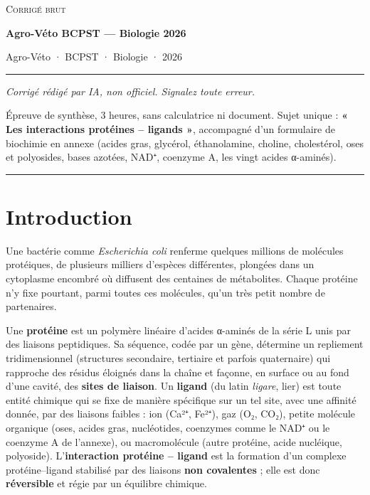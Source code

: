 \documentclass[11pt,a4paper]{article}
\begin{document}
\thispagestyle{plain}
\begin{center}
  {\small\scshape Corrigé brut}\par\smallskip
  {\LARGE\bfseries Agro-Véto BCPST — Biologie 2026\par}\medskip
  {\large Agro-Véto · BCPST · Biologie · 2026\par}
\end{center}
\vspace{2pt}\hrule\vspace{8pt}

\emph{Corrigé rédigé par IA, non officiel. Signalez toute erreur.}

Épreuve de synthèse, 3 heures, sans calculatrice ni document. Sujet unique : \textbf{« Les interactions protéines -- ligands »}, accompagné d'un formulaire de biochimie en annexe (acides gras, glycérol, éthanolamine, choline, cholestérol, oses et polyosides, bases azotées, NAD⁺, coenzyme A, les vingt acides α-aminés).

\begin{center}\rule{0.5\linewidth}{0.5pt}\end{center}

\hypertarget{introduction}{%
\section{Introduction}\label{introduction}}

Une bactérie comme \emph{Escherichia coli} renferme quelques millions de molécules protéiques, de plusieurs milliers d'espèces différentes, plongées dans un cytoplasme encombré où diffusent des centaines de métabolites. Chaque protéine n'y fixe pourtant, parmi toutes ces molécules, qu'un très petit nombre de partenaires.

Une \textbf{protéine} est un polymère linéaire d'acides α-aminés de la série L unis par des liaisons peptidiques. Sa séquence, codée par un gène, détermine un repliement tridimensionnel (structures secondaire, tertiaire et parfois quaternaire) qui rapproche des résidus éloignés dans la chaîne et façonne, en surface ou au fond d'une cavité, des \textbf{sites de liaison}. Un \textbf{ligand} (du latin \emph{ligare}, lier) est toute entité chimique qui se fixe de manière spécifique sur un tel site, avec une affinité donnée, par des liaisons faibles : ion (Ca²⁺, Fe²⁺), gaz (O₂, CO₂), petite molécule organique (oses, acides gras, nucléotides, coenzymes comme le NAD⁺ ou le coenzyme A de l'annexe), ou macromolécule (autre protéine, acide nucléique, polyoside). L'\textbf{interaction protéine -- ligand} est la formation d'un complexe protéine--ligand stabilisé par des liaisons \textbf{non covalentes} ; elle est donc \textbf{réversible} et régie par un équilibre chimique.
\end{document}
